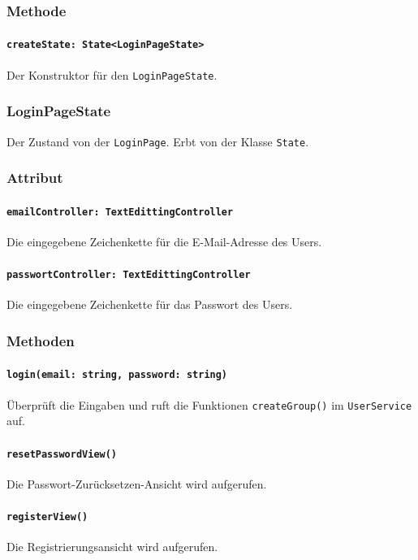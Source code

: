 \documentclass{entwurfsheft}
\begin{document}
        \subsubsection*{Methode}
            \paragraph*{\texttt{createState: State<LoginPageState>}} Der Konstruktor für den \texttt{LoginPageState}.
    
    \subsubsection{LoginPageState}
        Der Zustand von der \texttt{LoginPage}. Erbt von der Klasse \texttt{State}.
        \subsubsection*{Attribut}
            \paragraph*{\texttt{emailController: TextEdittingController}} Die eingegebene Zeichenkette für die E-Mail-Adresse des Users.
            \paragraph*{\texttt{passwortController: TextEdittingController}} Die eingegebene Zeichenkette für das Passwort des Users.

        \subsubsection*{Methoden}
            \paragraph*{\texttt{login(email: string, password: string)}} Überprüft die Eingaben und ruft die Funktionen \texttt{createGroup()} im \texttt{UserService} auf.
            \paragraph*{\texttt{resetPasswordView()}} Die Passwort-Zurücksetzen-Ansicht wird aufgerufen.
            \paragraph*{\texttt{registerView()}} Die Registrierungsansicht wird aufgerufen.
\end{document}

